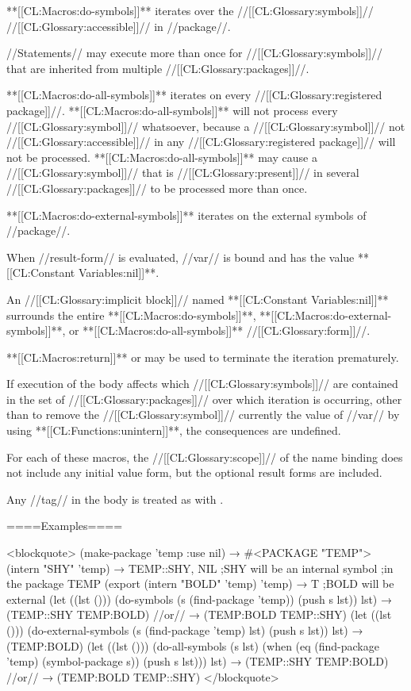 **[[CL:Macros:do-symbols]]** iterates over the //[[CL:Glossary:symbols]]// //[[CL:Glossary:accessible]]// in //package//.

//Statements// may execute more than once for //[[CL:Glossary:symbols]]// that are inherited from multiple //[[CL:Glossary:packages]]//.

**[[CL:Macros:do-all-symbols]]** iterates on every //[[CL:Glossary:registered package]]//. **[[CL:Macros:do-all-symbols]]** will not process every //[[CL:Glossary:symbol]]// whatsoever, because a //[[CL:Glossary:symbol]]// not //[[CL:Glossary:accessible]]// in any //[[CL:Glossary:registered package]]// will not be processed. **[[CL:Macros:do-all-symbols]]** may cause a //[[CL:Glossary:symbol]]// that is //[[CL:Glossary:present]]// in several //[[CL:Glossary:packages]]// to be processed more than once.

**[[CL:Macros:do-external-symbols]]** iterates on the external symbols of //package//.

When //result-form// is evaluated, //var// is bound and has the value **[[CL:Constant Variables:nil]]**.

An //[[CL:Glossary:implicit block]]// named **[[CL:Constant Variables:nil]]** surrounds the entire **[[CL:Macros:do-symbols]]**, **[[CL:Macros:do-external-symbols]]**, or **[[CL:Macros:do-all-symbols]]** //[[CL:Glossary:form]]//.

**[[CL:Macros:return]]** or  may be used to terminate the iteration prematurely.

If execution of the body affects which //[[CL:Glossary:symbols]]// are contained in the set of //[[CL:Glossary:packages]]// over which iteration is occurring, other than to remove the //[[CL:Glossary:symbol]]// currently the value of //var// by using **[[CL:Functions:unintern]]**, the consequences are undefined.

For each of these macros, the //[[CL:Glossary:scope]]// of the name binding does not include any initial value form, but the optional result forms are included.

Any //tag// in the body is treated as with .

====Examples====

<blockquote> (make-package 'temp :use nil) → #<PACKAGE "TEMP"> (intern "SHY" 'temp) → TEMP::SHY, NIL ;SHY will be an internal symbol ;in the package TEMP (export (intern "BOLD" 'temp) 'temp) → T ;BOLD will be external (let ((lst ())) (do-symbols (s (find-package 'temp)) (push s lst)) lst) → (TEMP::SHY TEMP:BOLD) //or// → (TEMP:BOLD TEMP::SHY) (let ((lst ())) (do-external-symbols (s (find-package 'temp) lst) (push s lst)) lst) → (TEMP:BOLD) (let ((lst ())) (do-all-symbols (s lst) (when (eq (find-package 'temp) (symbol-package s)) (push s lst))) lst) → (TEMP::SHY TEMP:BOLD) //or// → (TEMP:BOLD TEMP::SHY) </blockquote>

